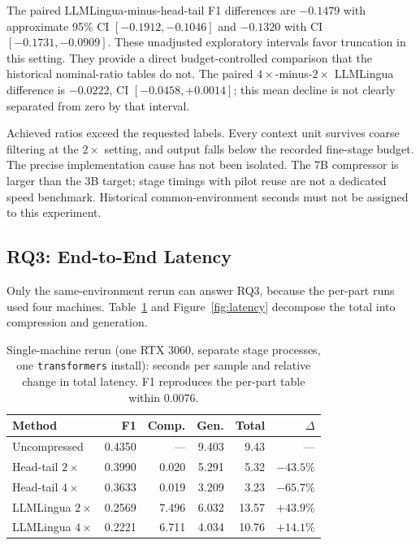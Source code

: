 ﻿\documentclass[10pt,a4paper,twocolumn]{article}
\begin{document}
The paired LLMLingua-minus-head-tail F1 differences are $-0.1479$ with approximate
95\% CI $[-0.1912,-0.1046]$ and $-0.1320$ with CI $[-0.1731,-0.0909]$.
These unadjusted exploratory intervals favor truncation in this setting. They
provide a direct budget-controlled comparison that the historical nominal-ratio
tables do not. The paired $4\times$-minus-$2\times$ LLMLingua difference is
$-0.0222$, CI $[-0.0458,+0.0014]$; this mean decline is not clearly separated
from zero by that interval.

Achieved ratios exceed the requested labels. Every context unit survives coarse
filtering at the $2\times$ setting, and output falls below the recorded fine-stage
budget. The precise implementation cause has not been isolated. The 7B
compressor is larger than the 3B target; stage timings with pilot reuse are not a
dedicated speed benchmark. Historical common-environment seconds must not be
assigned to this experiment.

\subsection{RQ3: End-to-End Latency}
\label{sec:rq3}

Only the same-environment rerun can answer RQ3, because the per-part runs used
four machines. Table~\ref{tab:latency} and Figure~\ref{fig:latency} decompose the
total into compression and generation.

\begin{table}[t]
\centering
\footnotesize
\setlength{\tabcolsep}{3.5pt}
\begin{tabular}{@{}lrrrrr@{}}
\toprule
Method & F1 & Comp. & Gen. & Total & $\Delta$ \\
\midrule
Uncompressed   & 0.4350 & ---   & 9.403 & 9.43  & --- \\
Head-tail $2\times$ & 0.3990 & 0.020 & 5.291 & 5.32 & $-43.5\%$ \\
Head-tail $4\times$ & 0.3633 & 0.019 & 3.209 & 3.23 & $-65.7\%$ \\
LLMLingua $2\times$ & 0.2569 & 7.496 & 6.032 & 13.57 & $+43.9\%$ \\
LLMLingua $4\times$ & 0.2221 & 6.711 & 4.034 & 10.76 & $+14.1\%$ \\
\bottomrule
\end{tabular}
\caption{Single-machine rerun (one RTX 3060, separate stage processes, one
\texttt{transformers} install): seconds per sample and relative change in total
latency. F1 reproduces the per-part table within 0.0076.}
\label{tab:latency}
\end{table}
\end{document}
